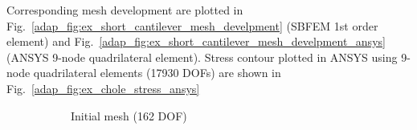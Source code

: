 Corresponding mesh development are plotted in Fig.~\ref{adap_fig:ex_short_cantilever_mesh_develpment} (SBFEM 1\textup{st} order element) and Fig.~\ref{adap_fig:ex_short_cantilever_mesh_develpment_ansys} (ANSYS 9-node quadrilateral element).
Stress contour plotted in ANSYS using 9-node quadrilateral elements (17930 DOFs) are shown in Fig.~\ref{adap_fig:ex_chole_stress_ansys}
\begin{figure}[h!]
\centering
    \begin{subfigure}[b]{0.4\linewidth}
        \centering
        \caption{Initial mesh (162 DOF)}
    \end{subfigure}
    \begin{subfigure}[b]{0.4\linewidth}
        \centering
        \scalebox{0.25}{
}
\end{subfigure}
\end{figure}
